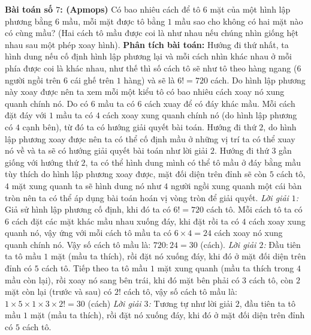\begin{multicols}{2}
\begin{multicols}{2}
\begin{figure}[H]
			\vspace*{-5pt}
		\end{figure}
	\end{multicols}
	\textbf{Bài toán số $7$: (Apmops)}
	\vskip 0.1cm
	Có bao nhiêu cách để tô $6$ mặt của một hình lập phương bằng $6$ mầu, mỗi mặt được tô bằng $1$ mầu sao cho không có hai mặt nào có cùng mầu? (Hai cách tô mầu được coi là như nhau nếu chúng nhìn giống hệt nhau sau một phép xoay hình). 
	\vskip 0.1cm
	\textbf{Phân tích bài toán:} Hướng đi thứ nhất, ta hình dung nếu cố định hình lập phương lại và mỗi cách nhìn khác nhau ở mỗi phía được coi là khác nhau, như thế thì số cách tô sẽ như tô theo hàng ngang ($6$ người ngồi trên $6$ cái ghế trên $1$ hàng) và sẽ là $6!=720$ cách. Do hình lập phương này xoay được nên ta xem mỗi một kiểu tô có bao nhiêu cách xoay nó xung quanh chính nó. Do có $6$ mầu ta có $6$ cách xuay để có đáy khác mầu. Mỗi cách đặt đáy với $1$ mầu ta có $4$ cách xoay xung quanh chính nó (do hình lập phương có $4$ cạnh bên), từ đó ta có hướng giải quyết bài toán.
	\vskip 0.1cm
	Hướng đi thứ $2$, do hình lập phương xoay được nên ta có thể cố định mầu ở những vị trí ta có thể xuay nó về và ta sẽ có hướng giải quyết bài toán như lời giải $2$.
	\vskip 0.1cm
	Hướng đi thứ $3$ gần giống với hướng thứ $2$, ta có thể hình dung mình có thể tô mầu ở đáy bằng mầu tùy thích do hình lập phương xoay được, mặt đối diện trên đỉnh sẽ còn $5$ cách tô, $4$ mặt xung quanh ta sẽ hình dung nó như $4$ người ngồi xung quanh một cái bàn tròn nên ta có thể áp dụng bài toán hoán vị vòng tròn để giải quyết.
	\vskip 0.1cm
	\textit{Lời giải $1$:}
	\vskip 0.1cm 
	Giả sử hình lập phương cố định, khi đó ta có $6!=720$ cách tô.
	\vskip 0.1cm
	Mỗi cách tô ta có $6$ cách đặt các mặt khác mầu nhau xuống đáy, khi đặt rồi ta có $4$ cách xoay xung quanh nó, vậy ứng với mỗi cách tô mầu ta có $6\times4=24$ cách xoay nó xung quanh chính nó. Vậy số cách tô mầu là: $720:24=30$ (cách).
	\vskip 0.1cm
	\textit{Lời giải $2$:}
	\vskip 0.1cm 
	Đầu tiên ta tô mầu $1$ mặt (mầu ta thích), rồi đặt nó xuống đáy, khi đó ở mặt đối diện trên đỉnh có $5$ cách tô.
	\vskip 0.1cm
	Tiếp theo ta tô mầu $1$ mặt xung quanh (mầu ta thích trong $4$ mầu còn lại), rồi xoay nó sang bên trái, khi đó mặt bên phải có $3$ cách tô, còn $2$ mặt còn lại (trước và sau) có $2!$ cách tô, vậy số cách tô mầu là: $1\times5\times1\times3\times2!=30$ (cách)
	\vskip 0.1cm
	\textit{Lời giải $3$:}
	\vskip 0.1cm
	Tương tự như lời giải $2$, đầu tiên ta tô mầu $1$ mặt (mầu ta thích), rồi đặt nó xuống đáy, khi đó ở mặt đối diện trên đỉnh có $5$ cách tô.

\end{multicols}
